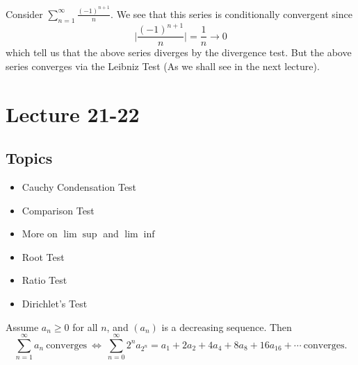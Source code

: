 \documentclass[a4paper]{article}
\begin{document}
\begin{eg}
    Consider \( \sum_{ n=1  }^{ \infty  } \frac{ (-1)^{n+1} }{ n }  \). We see that this series is conditionally convergent since  
    \[  \Big| \frac{ (-1)^{n+1} }{ n }  \Big|  = \frac{ 1 }{ n } \to 0 \]
    which tell us that the above series diverges by the divergence test. But the above series converges via the Leibniz Test (As we shall see in the next lecture).
\end{eg}

\section{Lecture 21-22}

\subsection{Topics}

\begin{itemize}
    \item Cauchy Condensation Test
    \item Comparison Test
    \item More on \( \lim \sup   \) and \( \lim \inf  \)
    \item Root Test
    \item Ratio Test
    \item Dirichlet's Test
\end{itemize}

\begin{theorem}
    Assume \( {a}_{n} \geq 0  \) for all \( n  \), and \( ({a}_{n}) \) is a decreasing sequence. Then
    \[  \sum_{ n=1  }^{ \infty  } {a}_{n} \ \text{converges} \ \iff \ \sum_{ n=0 }^{ \infty  } 2^{n} {a}_{2^{n}} = {a}_{1} + {2a}_{2} + {4a}_{4} + {8a}_{8} + {16a}_{16} + \cdots \ \text{converges}. \]
\end{theorem} 
\end{document}
